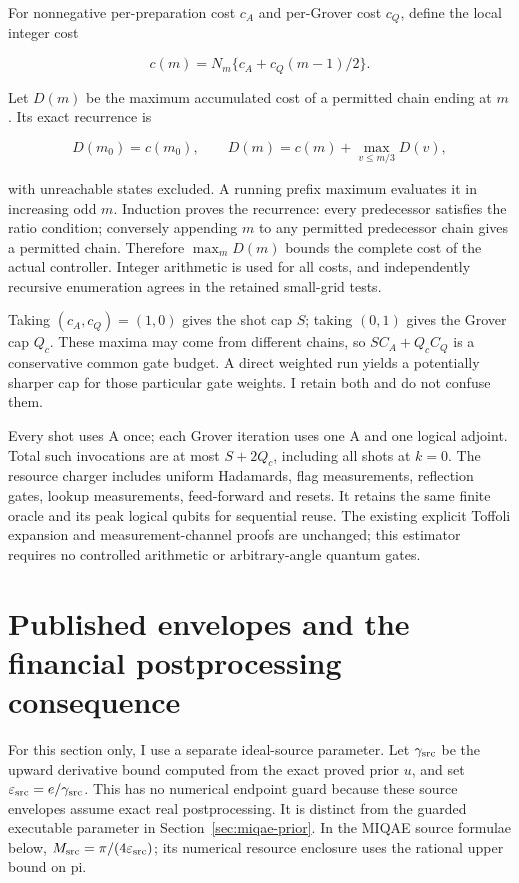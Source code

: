For nonnegative per-preparation cost \(c_A\) and per-Grover cost \(c_Q\), define the local integer cost

\[
 c(m)=N_m\{c_A+c_Q(m-1)/2\}.
\]

Let \(D(m)\) be the maximum accumulated cost of a permitted chain ending at \(m\). Its exact recurrence is

\[
 D(m_0)=c(m_0),\qquad
 D(m)=c(m)+\max_{v\leq m/3}D(v),
\]

with unreachable states excluded. A running prefix maximum evaluates it in increasing odd \(m\). Induction proves the recurrence: every predecessor satisfies the ratio condition; conversely appending \(m\) to any permitted predecessor chain gives a permitted chain. Therefore \(\max_mD(m)\) bounds the complete cost of the actual controller. Integer arithmetic is used for all costs, and independently recursive enumeration agrees in the retained small-grid tests.

Taking \((c_A,c_Q)=(1,0)\) gives the shot cap \(S\); taking \((0,1)\) gives the Grover cap \(Q_c\). These maxima may come from different chains, so \(S C_A+Q_c C_Q\) is a conservative common gate budget. A direct weighted run yields a potentially sharper cap for those particular gate weights. I retain both and do not confuse them.

Every shot uses A once; each Grover iteration uses one A and one logical adjoint. Total such invocations are at most \(S+2Q_c\), including all shots at \(k=0\). The resource charger includes uniform Hadamards, flag measurements, reflection gates, lookup measurements, feed-forward and resets. It retains the same finite oracle and its peak logical qubits for sequential reuse. The existing explicit Toffoli expansion and measurement-channel proofs are unchanged; this estimator requires no controlled arithmetic or arbitrary-angle quantum gates.

\section{Published envelopes and the financial postprocessing consequence}
\label{sec:miqae-published}

For this section only, I use a separate ideal-source parameter. Let \(\gamma_{\rm src}\) be the upward derivative bound computed from the exact proved prior \(u\), and set \(\varepsilon_{\rm src}=e/\gamma_{\rm src}\). This has no numerical endpoint guard because these source envelopes assume exact real postprocessing. It is distinct from the guarded executable parameter in Section~\ref{sec:miqae-prior}. In the MIQAE source formulae below, \(M_{\rm src}=\pi/(4\varepsilon_{\rm src})\); its numerical resource enclosure uses the rational upper bound on pi.

